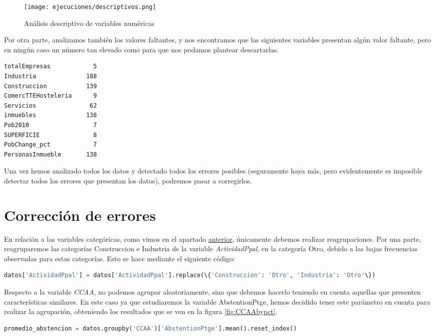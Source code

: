 \documentclass[a4paper,onecolumn]{extarticle}
\let\stdsection\section
\renewcommand\section{\newpage\stdsection}
\begin{document}
\begin{sloppypar}
\begin{wrapfigure}[13]{L}{8cm}
    \texttt{[image: ejecuciones/descriptivos.png]}
    \small{\caption{Análisis descriptivo de variables numéricas}}
\end{wrapfigure} 

Por otra parte, analizamos también los valores faltantes, y nos encontramos que las siguientes variables presentan algún valor faltante, pero en ningún caso 
un número tan elevado como para que nos podamos plantear descartarlas.
\begin{lstlisting}[numbers=none]
totalEmpresas            5
Industria              188
Construccion           139
ComercTTEHosteleria      9
Servicios               62
inmuebles              138
Pob2010                  7
SUPERFICIE               8
PobChange_pct            7
PersonasInmueble       138
\end{lstlisting}

Una vez hemos analizado todos los datos y detectado todos los errores posibles (seguramente haya más, pero evidentemente es imposible detectar todos los 
errores que presentan los datos), podremos pasar a corregirlos.
\\
\section{Corrección de errores}\label{errores}
En relación a las variables categóricas, como vimos en el apartado \hyperref[analisis]{anterior}, únicamente debemos realizar reagrupaciones. Por una parte,
reagruparemos las categorías Construccion e Industria de la variable \textit{ActividadPpal}, en la categoría Otro, debido a las bajas frecuencias observadas 
para estas categorías. Esto se hace mediante el siguiente código:
\begin{lstlisting}[language=Python,numbers=none]
datos['ActividadPpal'] = datos['ActividadPpal'].replace(\{'Construccion': 'Otro', 'Industria': 'Otro'\})
\end{lstlisting}

Respecto a la variable \textit{CCAA}, no podemos agrupar aleatoriamente, sino que debemos hacerlo teniendo en cuenta aquellas que presenten características 
similares. En este caso ya que estudiaremos la variable AbstentionPtge, hemos decidido tener este parámetro en cuenta para realizar la agrupación, obteniendo 
los resultados que se ven en la figura \ref{fig:CCAAbypct}.
\begin{lstlisting}[language=Python,numbers=none]
promedio_abstencion = datos.groupby('CCAA')['AbstentionPtge'].mean().reset_index()
\end{lstlisting}


\end{sloppypar}
\end{document}
